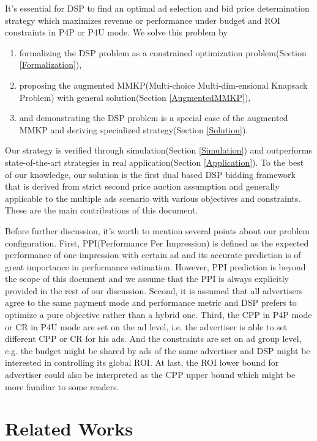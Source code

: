 \documentclass[sigconf]{acmart}
\begin{document}
It's essential for DSP to find an optimal ad selection and bid price determination strategy
    which maximizes revenue or performance under budget and ROI constraints in P4P or P4U mode.
We solve this problem by

\begin{enumerate}
\item formalizing the DSP problem as a constrained optimization problem(Section \ref{Formalization}),
\item proposing the augmented MMKP(Multi-choice Multi-dim-ensional Knapsack Problem) with general solution(Section \ref{AugmentedMMKP}),
\item and demonstrating the DSP problem is a special case of the augmented MMKP and deriving specialized strategy(Section \ref{Solution}).
\end{enumerate}

Our strategy is verified through simulation(Section \ref{Simulation}) and
    outperforms state-of-the-art strategies in real application(Section \ref{Application}).
To the best of our knowledge, our solution is the first dual based DSP bidding framework
    that is derived from strict second price auction assumption and
    generally applicable to the multiple ads scenario with various objectives and constraints.
These are the main contributions of this document.

Before further discussion, it's worth to mention several points about our problem configuration.
First, PPI(Performance Per Impression) is defined as the expected performance of one impression with certain ad
    and its accurate prediction is of great importance in performance estimation.
However, PPI prediction is beyond the scope of this document
    and we assume that the PPI is always explicitly provided in the rest of our discussion.
Second, it is assumed that all advertisers agree to the same payment mode and performance metric
    and DSP prefers to optimize a pure objective rather than a hybrid one.
Third, the CPP in P4P mode or CR in P4U mode are set on the ad level,
    i.e. the advertiser is able to set different CPP or CR for his ads.
And the constraints are set on ad group level,
    e.g. the budget might be shared by ads of the same advertiser
    and DSP might be interested in controlling its global ROI.
At last, the ROI lower bound for advertiser could also be interpreted as the CPP upper bound
    which might be more familiar to some readers.

\section{Related Works}
\end{document}
